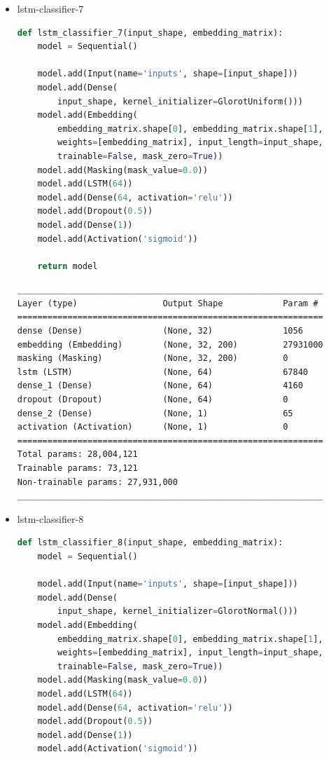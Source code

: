 \documentclass{article}
\begin{document}
\begin{itemize}
  \item lstm-classifier-7

\begin{lstlisting}[language=Python, caption=Дефиниция на lstm-classifier-7.]
def lstm_classifier_7(input_shape, embedding_matrix):
    model = Sequential()

    model.add(Input(name='inputs', shape=[input_shape]))
    model.add(Dense(
        input_shape, kernel_initializer=GlorotUniform()))
    model.add(Embedding(
        embedding_matrix.shape[0], embedding_matrix.shape[1],
        weights=[embedding_matrix], input_length=input_shape,
        trainable=False, mask_zero=True))
    model.add(Masking(mask_value=0.0))
    model.add(LSTM(64))
    model.add(Dense(64, activation='relu'))
    model.add(Dropout(0.5))
    model.add(Dense(1))
    model.add(Activation('sigmoid'))

    return model
\end{lstlisting}

\begin{lstlisting}[numbers=none, caption=Обобщение на lstm-classifier-7.]
_____________________________________________________________
Layer (type)                 Output Shape            Param #
=============================================================
dense (Dense)                (None, 32)              1056
embedding (Embedding)        (None, 32, 200)         27931000
masking (Masking)            (None, 32, 200)         0
lstm (LSTM)                  (None, 64)              67840
dense_1 (Dense)              (None, 64)              4160
dropout (Dropout)            (None, 64)              0
dense_2 (Dense)              (None, 1)               65
activation (Activation)      (None, 1)               0
=============================================================
Total params: 28,004,121
Trainable params: 73,121
Non-trainable params: 27,931,000
_____________________________________________________________
\end{lstlisting}

  \item lstm-classifier-8

\begin{lstlisting}[language=Python, caption=Дефиниция на lstm-classifier-8.]
def lstm_classifier_8(input_shape, embedding_matrix):
    model = Sequential()

    model.add(Input(name='inputs', shape=[input_shape]))
    model.add(Dense(
        input_shape, kernel_initializer=GlorotNormal()))
    model.add(Embedding(
        embedding_matrix.shape[0], embedding_matrix.shape[1],
        weights=[embedding_matrix], input_length=input_shape,
        trainable=False, mask_zero=True))
    model.add(Masking(mask_value=0.0))
    model.add(LSTM(64))
    model.add(Dense(64, activation='relu'))
    model.add(Dropout(0.5))
    model.add(Dense(1))
    model.add(Activation('sigmoid'))


\end{lstlisting}
\end{itemize}
\end{document}
